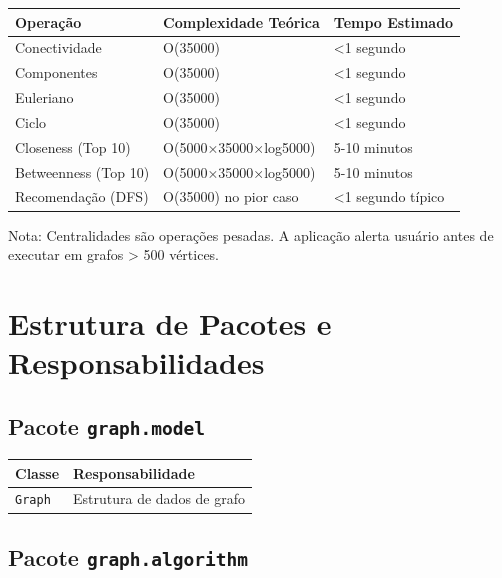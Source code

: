 \documentclass[12pt,a4paper]{article}
\begin{document}
\begin{table}[h]
\centering
\begin{tabular}{|l|l|l|}
\hline
\textbf{Operação} & \textbf{Complexidade Teórica} & \textbf{Tempo Estimado} \\
\hline
Conectividade & O(35000) & <1 segundo \\
\hline
Componentes & O(35000) & <1 segundo \\
\hline
Euleriano & O(35000) & <1 segundo \\
\hline
Ciclo & O(35000) & <1 segundo \\
\hline
Closeness (Top 10) & O(5000×35000×log5000) & 5-10 minutos \\
\hline
Betweenness (Top 10) & O(5000×35000×log5000) & 5-10 minutos \\
\hline
Recomendação (DFS) & O(35000) no pior caso & <1 segundo típico \\
\hline
\end{tabular}
\end{table}

Nota: Centralidades são operações pesadas. A aplicação alerta usuário antes de executar em grafos > 500 vértices.

\newpage

\section{Estrutura de Pacotes e Responsabilidades}

\subsection{Pacote \texttt{graph.model}}

\begin{table}[h]
\centering
\begin{tabular}{|l|l|}
\hline
\textbf{Classe} & \textbf{Responsabilidade} \\
\hline
\texttt{Graph} & Estrutura de dados de grafo \\
\hline
\end{tabular}
\end{table}

\subsection{Pacote \texttt{graph.algorithm}}
\end{document}
